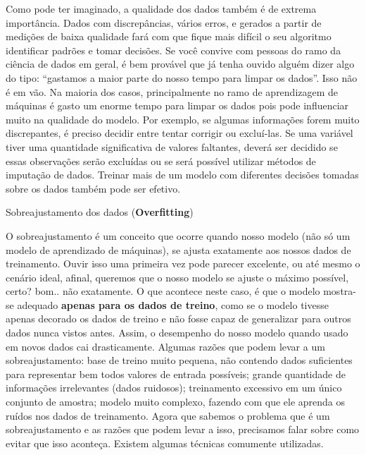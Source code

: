 \documentclass[
  letterpaper,
  DIV=11,
  numbers=noendperiod]{scrreprt}
\begin{document}
Como pode ter imaginado, a qualidade dos dados também é de extrema
importância. Dados com discrepâncias, vários erros, e gerados a partir
de medições de baixa qualidade fará com que fique mais difícil o seu
algoritmo identificar padrões e tomar decisões. Se você convive com
pessoas do ramo da ciência de dados em geral, é bem provável que já
tenha ouvido alguém dizer algo do tipo: ``gastamos a maior parte do
nosso tempo para limpar os dados''. Isso não é em vão. Na maioria dos
casos, principalmente no ramo de aprendizagem de máquinas é gasto um
enorme tempo para limpar os dados pois pode influenciar muito na
qualidade do modelo. Por exemplo, se algumas informações forem muito
discrepantes, é preciso decidir entre tentar corrigir ou excluí-las. Se
uma variável tiver uma quantidade significativa de valores faltantes,
deverá ser decidido se essas observações serão excluídas ou se será
possível utilizar métodos de imputação de dados. Treinar mais de um
modelo com diferentes decisões tomadas sobre os dados também pode ser
efetivo.

Sobreajustamento dos dados (\textbf{Overfitting})

O sobreajustamento é um conceito que ocorre quando nosso modelo (não só
um modelo de aprendizado de máquinas), se ajusta exatamente aos nossos
dados de treinamento. Ouvir isso uma primeira vez pode parecer
excelente, ou até mesmo o cenário ideal, afinal, queremos que o nosso
modelo se ajuste o máximo possível, certo? bom.. não exatamente. O que
acontece neste caso, é que o modelo mostra-se adequado \textbf{apenas
para os dados de treino}, como se o modelo tivesse apenas decorado os
dados de treino e não fosse capaz de generalizar para outros dados nunca
vistos antes. Assim, o desempenho do nosso modelo quando usado em novos
dados cai drasticamente. Algumas razões que podem levar a um
sobreajustamento: base de treino muito pequena, não contendo dados
suficientes para representar bem todos valores de entrada possíveis;
grande quantidade de informações irrelevantes (dados ruidosos);
treinamento excessivo em um único conjunto de amostra; modelo muito
complexo, fazendo com que ele aprenda os ruídos nos dados de
treinamento. Agora que sabemos o problema que é um sobreajustamento e as
razões que podem levar a isso, precisamos falar sobre como evitar que
isso aconteça. Existem algumas técnicas comumente utilizadas.
\end{document}
